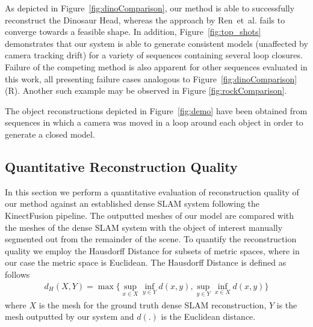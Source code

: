 As depicted in Figure~\ref{fig:dinoComparison}, our method is able to successfully reconstruct the Dinosaur Head, whereas the approach by Ren~et~al. fails to converge towards a feasible shape.
In addition, Figure~\ref{fig:top_shots} demonstrates that our system is able to generate consistent models (unaffected by camera tracking drift) for a variety of sequences containing several loop closures.
Failure of the competing method %
is also apparent for other sequences evaluated in this work, all presenting failure cases analogous to Figure~\ref{fig:dinoComparison}(R). %
Another such example may be observed in Figure \ref{fig:rockComparison}.

The object reconstructions depicted in Figure~\ref{fig:demo} have been obtained from sequences in which a camera was moved in a loop around each object in order to generate a closed model.


\subsection{Quantitative Reconstruction Quality}
In this section we perform a quantitative evaluation of reconstruction quality of our method against an established dense SLAM system \cite{Prisacariu2014} following the KinectFusion \cite{Newcombe2011} pipeline.
The outputted meshes of our model are compared with the meshes of the dense SLAM system with the object of interest manually segmented out from the remainder of the scene. To quantify the reconstruction quality 
we employ the Hausdorff Distance for subsets of metric spaces, where in our case the metric space is Euclidean. The Hausdorff Distance is defined as follows
\begin{equation}
\begin{split}
d_{H}(X, Y) = \max \Bigg \{ \sup_{x \in X} \inf_{y \in Y} d(x, y), \sup_{y \in Y} \inf_{x \in X} d(x, y) \Bigg \}
\end{split}
\end{equation}
where $X$ is the mesh for the ground truth dense SLAM reconstruction, $Y$ is the mesh outputted by our system and $d(.)$ is the Euclidean distance.

